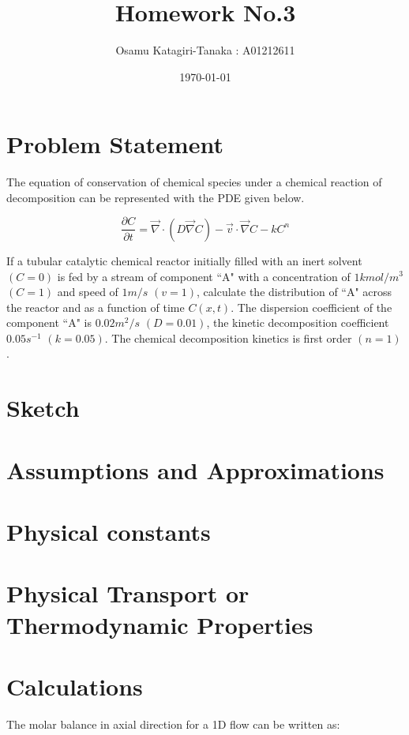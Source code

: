 \documentclass{article}
\title{Homework No.3}
\author{Osamu Katagiri-Tanaka : A01212611}
\date{\today}
\begin{document}
\maketitle

\section{Problem Statement}

The equation of conservation of chemical species under a chemical reaction of
decomposition can be represented with the PDE given below.

$$ \frac{\partial C}{\partial t} = \vec{\nabla} \cdot (D \vec{\nabla} C) - \vec{v} \cdot \vec{\nabla} C - k C^n $$

If a tubular catalytic chemical reactor initially filled with an inert solvent $(C = 0)$ is fed by a stream of component ``A" with a concentration of $1 kmol/m^3$ $(C = 1)$ and speed of $1 m/s$ $(v = 1)$, calculate the distribution of ``A" across the reactor and as a function of time $C(x, t)$. The dispersion coefficient of the component ``A" is $0.02 m^2/s$ $(D = 0.01)$, the kinetic decomposition coefficient $0.05 s^{-1}$ $(k = 0.05)$. The chemical decomposition kinetics is first order $(n = 1)$.

\section{Sketch}

\section{Assumptions and Approximations}


\section{Physical constants}

\section{Physical Transport or Thermodynamic Properties}

\section{Calculations}

The molar balance in axial direction for a 1D flow can be written as:
\end{document}
